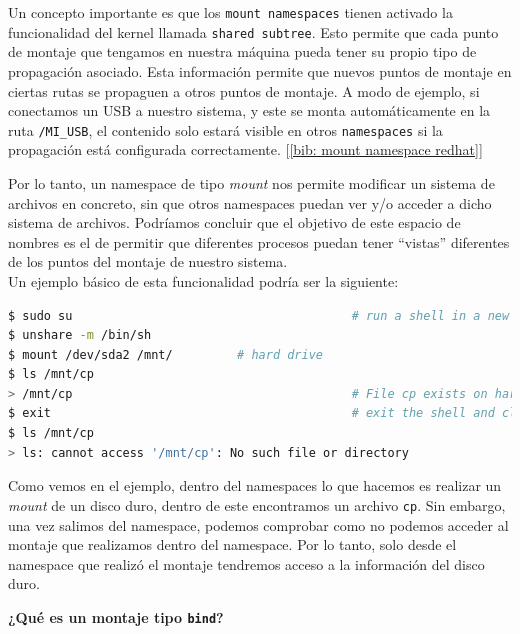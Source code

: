\documentclass[a4paper, oneside, 12pt]{book}
\begin{document}
	\noindent Un concepto importante es que los \texttt{mount namespaces} tienen activado la funcionalidad del kernel llamada \texttt{shared subtree}. Esto permite que cada punto de montaje que tengamos en nuestra máquina pueda tener su propio tipo de propagación asociado. Esta información permite que nuevos puntos de montaje en ciertas rutas se propaguen a otros puntos de montaje. A modo de ejemplo, si conectamos un USB a nuestro sistema, y este se monta automáticamente en la ruta \texttt{/MI\_USB}, el contenido solo estará visible en otros \texttt{namespaces} si la propagación está configurada correctamente. [\ref{bib: mount namespace redhat}] \\
	
	\par \noindent Por lo tanto, un namespace de tipo \textit{mount} nos permite modificar un sistema de archivos en concreto, sin que otros namespaces puedan ver y/o acceder a dicho sistema de archivos. Podríamos concluir que el objetivo de este espacio de nombres es el de permitir que diferentes procesos puedan tener ``vistas'' diferentes de los puntos del montaje de nuestro sistema. \\
	
	
	\noindent Un ejemplo básico de esta funcionalidad podría ser la siguiente:
	
	\addvspace{10px}

	\begin{lstlisting}[language=bash, caption=Uso de \texttt{mount namespace} con dispositivo físico]
$ sudo su										# run a shell in a new mount namespace
$ unshare -m /bin/sh
$ mount /dev/sda2 /mnt/			# hard drive
$ ls /mnt/cp
> /mnt/cp										# File cp exists on hard drive
$ exit											# exit the shell and close namespace
$ ls /mnt/cp
> ls: cannot access '/mnt/cp': No such file or directory
	\end{lstlisting}

	\addvspace{10px}
	
	\par \noindent Como vemos en el ejemplo, dentro del namespaces lo que hacemos es realizar un \textit{mount} de un disco duro, dentro de este encontramos un archivo \texttt{cp}. Sin embargo, una vez salimos del namespace, podemos comprobar como no podemos acceder al montaje que realizamos dentro del namespace. Por lo tanto, solo desde el namespace que realizó el montaje tendremos acceso a la información del disco duro. 
	
	\pagebreak
	
	\noindent \textbf{\large ¿Qué es un montaje tipo \texttt{bind}?}\\
	
\end{document}
